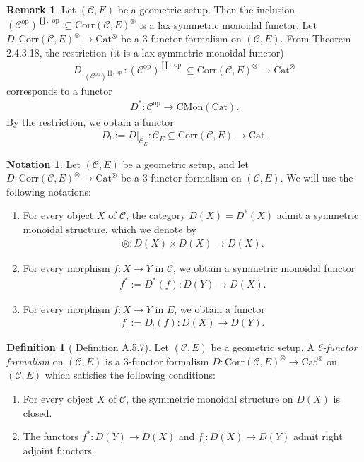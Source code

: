 \documentclass[a4paper,dvipdfmx,11pt,reqno]{amsart}
\DeclareMathOperator{\myop}{op}
\newcommand{\C}{\mathcal{C}}
\newcommand{\Cat}{\mathrm{Cat}}
\newcommand{\CMon}{\mathrm{CMon}}
\newcommand{\Corr}{\mathrm{Corr}}
\theoremstyle{definition}
\newtheorem{definition}[theorem]{Definition}
\newtheorem{notation}[theorem]{Notation}
\newtheorem{remark}[theorem]{Remark}
\begin{document}
\begin{remark}
  Let $(\C,E)$ be a geometric setup.
  Then the inclusion $(\C^{\myop})^{\coprod,\myop} \subseteq \Corr(\C,E)^{\otimes}$ is a lax symmetric monoidal functor.
  Let $ D : \Corr(\C,E)^{\otimes} \to \Cat^{\otimes}$ be a 3-functor formalism on $(\C,E)$.
  From \cite{HA} Theorem 2.4.3.18, the restriction (it is a lax symmetric monoidal functor)
  \begin{align*}
    D|_{(\C^{\myop})^{\coprod,\myop}} : (\C^{\myop})^{\coprod,\myop} \subseteq \Corr(\C,E)^{\otimes} \to \Cat^{\otimes}
  \end{align*}
  corresponds to a functor 
  \begin{align*}
    D^{*} : \C^{\myop} \to \CMon(\Cat).
  \end{align*}
  By the restriction, we obtain a functor 
  \begin{align*}
    D_{!} := D|_{\C_{E}} : \C_{E} \subseteq \Corr(\C,E) \to \Cat.
  \end{align*}
\end{remark}

\begin{notation}
  Let $(\C,E)$ be a geometric setup, and let $ D : \Corr(\C,E)^{\otimes} \to \Cat^{\otimes}$ be a 3-functor formalism on $(\C,E)$.
  We will use the following notations:
  \begin{enumerate}
    \item For every object $X$ of $\C$, the category $D(X)=D^{*}(X)$ admit a symmetric monoidal structure, which we denote by 
    \begin{align*}
      \otimes : D(X) \times D(X) \to D(X).
    \end{align*}
    \item For every morphism $f : X \to Y$ in $\C$, we obtain a symmetric monoidal functor 
    \begin{align*}
      f^{*} := D^{\ast}(f) : D(Y) \to D(X).
    \end{align*}
    \item For every morphism $f : X \to Y$ in $E$, we obtain a functor
    \begin{align*}
      f_{!} := D_{!}(f) : D(X) \to D(Y).
    \end{align*}
  \end{enumerate}
\end{notation}

\begin{definition}[\cite{Mann22} Definition A.5.7] \label{Mann.def.A.5.7}
  Let $(\C,E)$ be a geometric setup.
  A \textit{6-functor formalism} on $(\C,E)$ is a 3-functor formalism $ D : \Corr(\C,E)^{\otimes} \to \Cat^{\otimes}$ on $(\C,E)$ which satisfies the following conditions:
  \begin{enumerate}
    \item For every object $X$ of $\C$, the symmetric monoidal structure on $D(X)$ is closed.
    \item The functors $f^{*} : D(Y) \to D(X)$ and $f_! : D(X) \to D(Y)$ admit right adjoint functors.
  \end{enumerate}
\end{definition}
\end{document}
